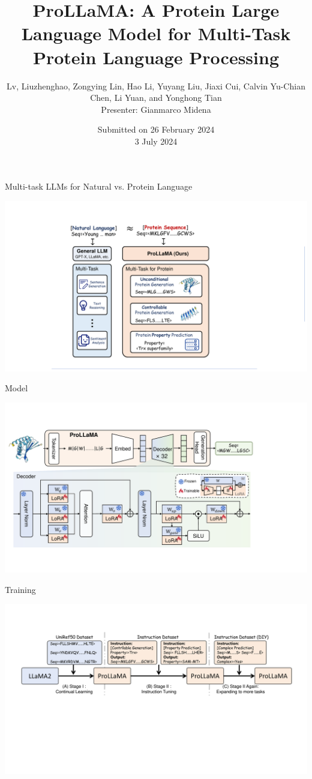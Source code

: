 \documentclass[dvipsnames]{beamer}
\title[ProLLaMA]
{ProLLaMA: A Protein Large Language Model for Multi-Task Protein Language Processing}
\author[Liuzhenghao Lv et al.]{Lv, Liuzhenghao, Zongying Lin, Hao Li, Yuyang Liu, Jiaxi Cui, Calvin Yu-Chian Chen, Li Yuan, and Yonghong Tian
\\\vspace{2em}Presenter: Gianmarco Midena}
\date[3 July 2024]{Submitted on 26 February 2024 
\\\vspace{2em}3 July 2024}
\begin{document}
\begin{frame}
\titlepage
\end{frame}

\begin{frame}{Multi-task LLMs for Natural vs. Protein Language}
	\begin{center}
		\includegraphics[scale=0.5]{images/multitask_LLMs_NLP_vs_PLP.pdf}
	\end{center}
\end{frame}

\begin{frame}{Model}
	\begin{center}
		\includegraphics[scale=0.44]{images/model.pdf}
	\end{center}
\end{frame}

\begin{frame}{Training}
	\begin{center}
		\includegraphics[scale=0.39]{images/training.pdf}
	\end{center}
\end{frame}
\end{document}
